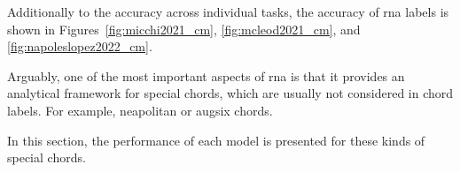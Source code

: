 



Additionally to the accuracy across individual tasks, the
accuracy of \gls{rna} labels is shown in
Figures~\ref{fig:micchi2021_cm}, \ref{fig:mcleod2021_cm},
and \ref{fig:napoleslopez2022_cm}.


Arguably, one of the most important aspects of \gls{rna} is
that it provides an analytical framework for special chords,
which are usually not considered in chord labels. For
example, \gls{neapolitan} or \gls{augsix} chords.

In this section, the performance of each model is presented
for these kinds of special chords.

